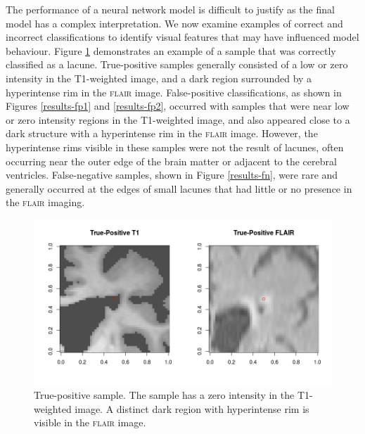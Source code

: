 The performance of a neural network model is difficult to justify as the final model has a complex interpretation. We now examine examples of correct and incorrect classifications to identify visual features that may have influenced model behaviour. Figure \ref{results-tp} demonstrates an example of a sample that was correctly classified as a lacune. True-positive samples generally consisted of a low or zero intensity in the T1-weighted image, and a dark region surrounded by a hyperintense rim in the \textsc{flair} image. False-positive classifications, as shown in Figures \ref{results-fp1} and \ref{results-fp2}, occurred with samples that were near low or zero intensity regions in the T1-weighted image, and also appeared close to a dark structure with a hyperintense rim in the \textsc{flair} image. However, the hyperintense rims visible in these samples were not the result of lacunes, often occurring near the outer edge of the brain matter or adjacent to the cerebral ventricles. False-negative samples, shown in Figure \ref{results-fn}, were rare and generally occurred at the edges of small lacunes that had little or no presence in the \textsc{flair} imaging.

\begin{figure}[ht]
\centering
\includegraphics[width=\linewidth]{Images/7_TP_t1_flair.png}
\caption{\small{True-positive sample. The sample has a zero intensity in the T1-weighted image. A distinct dark region with hyperintense rim is visible in the \textsc{flair} image.}}
\label{results-tp}
\end{figure}


